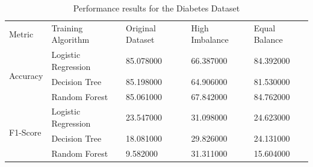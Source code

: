 \begin{table}[p]
\caption{Performance results for the Diabetes Dataset}
\begin{tabular}{lllll}
Metric & Training Algorithm & Original Dataset & High Imbalance & Equal Balance \\
\multirow[c]{3}{*}{Accuracy} & Logistic Regression & 85.078000 & 66.387000 & 84.392000 \\
 & Decision Tree & 85.198000 & 64.906000 & 81.530000 \\
 & Random Forest & 85.061000 & 67.842000 & 84.762000 \\
\multirow[c]{3}{*}{F1-Score} & Logistic Regression & 23.547000 & 31.098000 & 24.623000 \\
 & Decision Tree & 18.081000 & 29.826000 & 24.131000 \\
 & Random Forest & 9.582000 & 31.311000 & 15.604000 \\
\end{tabular}
\end{table}
